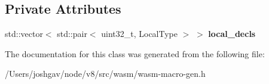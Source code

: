 \subsection*{Private Attributes}
\begin{DoxyCompactItemize}
\item 
std\+::vector$<$ std\+::pair$<$ uint32\+\_\+t, Local\+Type $>$ $>$ {\bfseries local\+\_\+decls}\hypertarget{classv8_1_1internal_1_1wasm_1_1_local_decl_encoder_a66a54cf93a4fa339613376c1d5c03adb}{}\label{classv8_1_1internal_1_1wasm_1_1_local_decl_encoder_a66a54cf93a4fa339613376c1d5c03adb}

\end{DoxyCompactItemize}


The documentation for this class was generated from the following file\+:\begin{DoxyCompactItemize}
\item 
/\+Users/joshgav/node/v8/src/wasm/wasm-\/macro-\/gen.\+h\end{DoxyCompactItemize}
